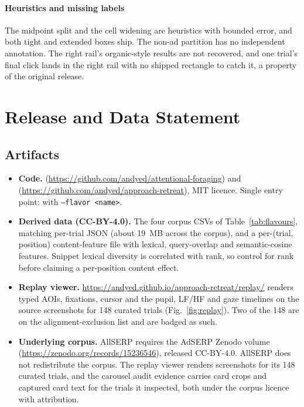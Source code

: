 \documentclass[sigconf,authorversion,natbib=true]{acmart}
\begin{document}
\paragraph{Heuristics and missing labels} The midpoint split and the cell widening are heuristics with bounded error, and both tight and extended boxes ship. The non-ad partition has no independent annotation. The right rail's organic-style results are not recovered, and one trial's final click lands in the right rail with no shipped rectangle to catch it, a property of the original release.

\section{Release and Data Statement}\label{sec:release}

\subsection{Artifacts}

\begin{itemize}
  \item \textbf{Code.}  (\url{https://github.com/andyed/attentional-foraging}) and  (\url{https://github.com/andyed/approach-retreat}), MIT licence. Single entry point:  with \texttt{--flavor <name>}.
  \item \textbf{Derived data (CC-BY-4.0).} The four corpus CSVs of Table~\ref{tab:flavours}, matching per-trial JSON (about 19~MB across the corpus), and a per-(trial, position) content-feature file with lexical, query-overlap and semantic-cosine features. Snippet lexical diversity is correlated with rank, so control for rank before claiming a per-position content effect.
  \item \textbf{Replay viewer.} \url{https://andyed.github.io/approach-retreat/replay/} renders typed AOIs, fixations, cursor and the pupil, LF/HF and gaze timelines on the source screenshots for 148 curated trials (Fig.~\ref{fig:replay}). Two of the 148 are on the alignment-exclusion list and are badged as such.
  \item \textbf{Underlying corpus.} AllSERP requires the AdSERP Zenodo volume (\url{https://zenodo.org/records/15236546}), released CC-BY-4.0. AllSERP does not redistribute the corpus. The replay viewer renders screenshots for its 148 curated trials, and the carousel audit evidence carries card crops and captured card text for the trials it inspected, both under the corpus licence with attribution.
\end{itemize}
\end{document}
